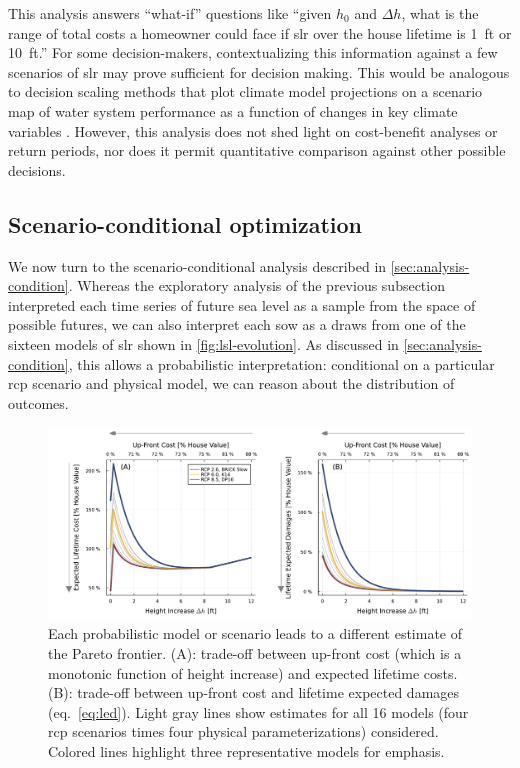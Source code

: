 \documentclass[11pt]{article}
\makeatletter
\DeclareRobustCommand\onedot{\futurelet\@let@token\@onedot}
\def\@onedot{\ifx\@let@token.\else.\null\fi\xspace}
\def\eg{\emph{e.g}\onedot} \def\Eg{\emph{E.g}\onedot}
\DeclareRobustCommand\onedot{\futurelet\@let@token\@onedot}
\def\@onedot{\ifx\@let@token.\else.\null\fi\xspace}
\def\eg{\emph{e.g}\onedot} \def\Eg{\emph{E.g}\onedot}
\makeatother
\begin{document}
This analysis answers ``what-if'' questions like ``given $h_0$ and $\Delta h$, what is the range of total costs a homeowner could face if \gls{slr} over the house lifetime is \SI{1}{ft} or \SI{10}{ft}.''
For some decision-makers, contextualizing this information against a few scenarios of \gls{slr} \citep[\eg, those of][]{sweet_slr:2022} may prove sufficient for decision making.
This would be analogous to decision scaling methods that plot climate model projections on a scenario map of water system performance as a function of changes in key climate variables \citep{Brown:2012kb,Steinschneider:2015kk}.
However, this analysis does not shed light on cost-benefit analyses or return periods, nor does it permit quantitative comparison against other possible decisions.

\subsection{Scenario-conditional optimization}\label{sec:results-conditional}
We now turn to the scenario-conditional analysis described in \cref{sec:analysis-condition}.
Whereas the exploratory analysis of the previous subsection interpreted each time series of future sea level as a sample from the space of possible futures, we can also interpret each \gls{sow} as a draws from one of the sixteen models of \gls{slr} shown in \cref{fig:lsl-evolution}.
As discussed in \cref{sec:analysis-condition}, this allows a probabilistic interpretation: conditional on a particular \gls{rcp} scenario and physical model, we can reason about the distribution of outcomes.

\begin{figure}
    \centering
    \includegraphics[width=\textwidth]{tradeoffs-by-rcp}
    \caption{
        Each probabilistic model or scenario leads to a different estimate of the Pareto frontier.
        (A): trade-off between up-front cost (which is a monotonic function of height increase) and expected lifetime costs.
        (B): trade-off between up-front cost and lifetime expected damages (eq.~\ref{eq:led}).
        Light gray lines show estimates for all 16 models (four \gls{rcp} scenarios times four physical parameterizations) considered.
        Colored lines highlight three representative models for emphasis.
    }\label{fig:tradeoffs-by-rcp}
\end{figure}
\end{document}
